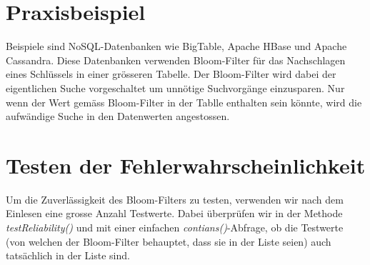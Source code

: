 \documentclass[12pt]{article}
\begin{document}
\section{Praxisbeispiel}
Beispiele sind NoSQL-Datenbanken wie BigTable, Apache HBase und Apache Cassandra. Diese Datenbanken verwenden Bloom-Filter für das Nachschlagen eines Schlüssels in einer grösseren Tabelle. Der Bloom-Filter wird dabei der eigentlichen Suche vorgeschaltet um unnötige Suchvorgänge einzusparen. Nur wenn der Wert gemäss Bloom-Filter in der Tablle enthalten sein könnte, wird die aufwändige Suche in den Datenwerten angestossen.

\section{Testen der Fehlerwahrscheinlichkeit}
Um die Zuverlässigkeit des Bloom-Filters zu testen, verwenden wir nach dem Einlesen eine grosse Anzahl Testwerte. Dabei überprüfen wir in der Methode \textit{testReliability()} und mit einer einfachen \textit{contians()}-Abfrage, ob die Testwerte (von welchen der Bloom-Filter behauptet, dass sie in der Liste seien) auch tatsächlich in der Liste sind.
\end{document}
